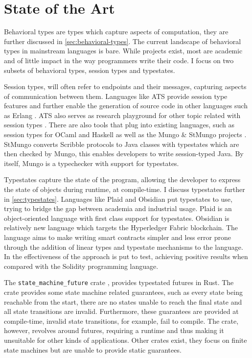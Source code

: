 \section{State of the Art}\label{sec:state-of-the-art}

Behavioral types are types which capture aspects of computation, they are further discussed in \autoref{sec:behavioral-types}.
The current landscape of behavioral types in mainstream languages is bare.
While projects exist, most are academic and of little impact in the way programmers write their code.
I focus on two subsets of behavioral types, session types and typestates.

Session types, will often refer to endpoints and their messages, capturing aspects of communication between them.
Languages like ATS provide session type features and further enable the generation of source code in other languages
such as Erlang \autocite{Xi2016}. ATS also serves as research playground for other topic related with session types \autocite{Xi2016a}.
There are also tools that plug into existing languages, such as session types for OCaml and Haskell \autocite{Gay2017}
as well as the Mungo \& StMungo projects \autocite{Kouzapas2018, Voinea2020}.
StMungo converts Scribble \autocite{Yoshida2014} protocols to Java classes with typestates which are then checked by Mungo,
this enables developers to write session-typed Java.
By itself, Mungo is a typechecker with support for typestates.

Typestates capture the state of the program,
allowing the developer to express the state of objects during runtime, at compile-time.
I discuss typestates further in \autoref{sec:typestates}.
Languages like Plaid \autocite{Aldrich2009} and Obsidian \autocite{Coblenz2020, Coblenz2020a} put typestates to use,
trying to bridge the gap between academia and industrial usage.
Plaid is an object-oriented language with first class support for typestates.
Obsidian is relatively new language which targets the Hyperledger Fabric blockchain.
The language aims to make writing smart contracts simpler and less error prone
through the addition of linear types and typestate mechanisms to the language.
In \autocite{Coblenz2020} the effectiveness of the approach is put to test,
achieving positive results when compared with the Solidity programming language.

The \texttt{state\_machine\_future} crate \autocite{Fitzgerald2019}, provides typestated futures in Rust.
The crate provides some state machine related guarantees, such as every state being reachable from the start,
there are no states unable to reach the final state and all state transitions are invalid.
Furthermore, these guarantees are provided at compile-time, invalid state transitions, for example, fail to compile.
The crate, however, revolves around futures, requiring a runtime and thus making it unsuitable for other kinds of applications.
Other crates exist, they focus on finite state machines but are unable to provide static guarantees.

